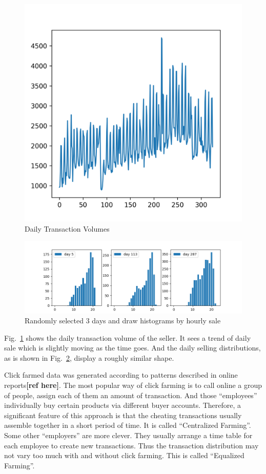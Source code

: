 \documentclass[a4paper]{IEEEtran}
\begin{document}
			
			\begin{figure}[!ht]
				\centering
				\includegraphics[width=0.75\linewidth]{fig/DailyTransactionVolume.png}
				\caption{Daily Transaction Volumes}
				\label{fig:daily-transaction-volume}
			\end{figure}
			
			\begin{figure}[ht]
				\centering
				\includegraphics[width=\linewidth]{fig/SaleDistributionSamples.png}
				\caption{Randomly selected 3 days and draw histograms by hourly sale}
				\label{fig:sale-distribution-sample}
			\end{figure}
			
			Fig.~\ref{fig:daily-transaction-volume} shows the daily transaction volume of the seller. It sees a trend of daily sale which is slightly moving as the time goes. And the daily selling distributions, as is shown in Fig.~\ref{fig:sale-distribution-sample}, display a roughly similar shape.
			
			Click farmed data was generated according to patterns described in online reports\textbf{[ref here]}. The most popular way of click farming is to call online a group of people, assign each of them an amount of transaction. And those ``employees'' individually buy certain products via different buyer accounts. Therefore, a significant feature of this approach is that the cheating transactions usually assemble together in a short period of time. It is called ``Centralized Farming''. Some other ``employers'' are more clever. They usually arrange a time table for each employee to create new transactions. Thus the transaction distribution may not vary too much with and without click farming. This is called ``Equalized Farming''.
			
\end{document}
